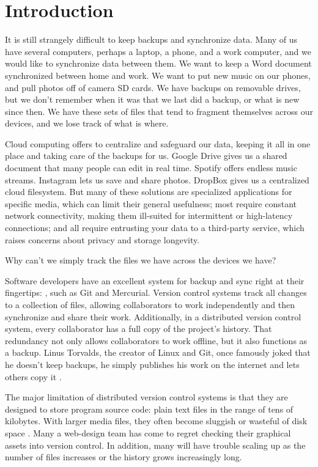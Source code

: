 \chapter{Introduction}

It is still strangely difficult to keep backups and synchronize data. Many of us
have several computers, perhaps a laptop, a phone, and a work computer, and we
would like to synchronize data between them. We want to keep a Word document
synchronized between home and work. We want to put new music on our phones, and
pull photos off of camera SD cards. We have backups on removable drives, but we
don't remember when it was that we last did a backup, or what is new since then.
We have these sets of files that tend to fragment themselves across our devices,
and we lose track of what is where.

Cloud computing offers to centralize and safeguard our data, keeping it all in
one place and taking care of the backups for us. Google Drive gives us a shared
document that many people can edit in real time. Spotify offers endless music
streams. Instagram lets us save and share photos. DropBox gives us a centralized
cloud filesystem. But many of these solutions are specialized applications for
specific media, which can limit their general usefulness; most require constant
network connectivity, making them ill-suited for intermittent or high-latency
connections; and all require entrusting your data to a third-party service,
which raises concerns about privacy and storage longevity.

Why can't we simply track the files we have across the devices we have?

Software developers have an excellent system for backup and sync right at their
fingertips: , such as Git
and Mercurial. Version control systems track all changes to a collection of
files, allowing collaborators to work independently and then synchronize and
share their work. Additionally, in a distributed version control system, every
collaborator has a full copy of the project's history. That redundancy not only
allows collaborators to work offline, but it also functions as a backup. Linus
Torvalds, the creator of Linux and Git, once famously joked that he doesn't keep
backups, he simply publishes his work on the internet and lets others copy it
\cite{linus_no_backups}.

The major limitation of distributed version control systems is that they are
designed to store program source code: plain text files in the range of tens of
kilobytes. With larger media files, they often become sluggish or wasteful of
disk space . Many a
web-design team has come to regret checking their graphical assets into version
control. In addition, many will have trouble scaling up
 as the number of files increases or the history
grows increasingly long.

